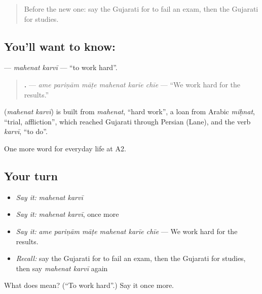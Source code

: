 \label{lesson:GU-C246-mahenat-karvi}



\begin{quote}
Before the new one: say the Gujarati for to fail an exam, then the Gujarati for studies.
\end{quote}

\subsection*{You'll want to know:  }
\textbf{ } — \emph{mahenat karvī} — \textquotedblleft{}to work hard\textquotedblright{}.

\begin{quote}
\textbf{     .} — \emph{ame pariṇām māṭe mahenat karīe chīe} — \textquotedblleft{}We work hard for the results.\textquotedblright{}
\end{quote}

\begin{cousinweb}
\textbf{ } (\emph{mahenat karvī}) is built from \emph{mahenat}, \textquotedblleft{}hard work\textquotedblright{}, a loan from Arabic \emph{miḥnat}, \textquotedblleft{}trial, affliction\textquotedblright{}, which reached Gujarati through Persian (Lane), and the verb \emph{karvī}, \textquotedblleft{}to do\textquotedblright{}.
\end{cousinweb}

\begin{grammarlens}[title={What you've built}]
One more word for everyday life at A2.
\end{grammarlens}

\subsection*{Your turn}
\begin{itemize}
\raggedright
  \item \emph{Say it:} \emph{mahenat karvī}
  \item \emph{Say it:} \emph{mahenat karvī}, once more
  \item \emph{Say it:} \emph{ame pariṇām māṭe mahenat karīe chīe} — We work hard for the results.
  \item \emph{Recall:} say the Gujarati for to fail an exam, then the Gujarati for studies, then say \emph{mahenat karvī} again
\end{itemize}

\begin{tcolorbox}[breakable,colback=teal!4,colframe=teal!35!black,title={Before you move on}]
What does   mean? (\textquotedblleft{}To work hard\textquotedblright{}.) Say it once more.
\end{tcolorbox}
